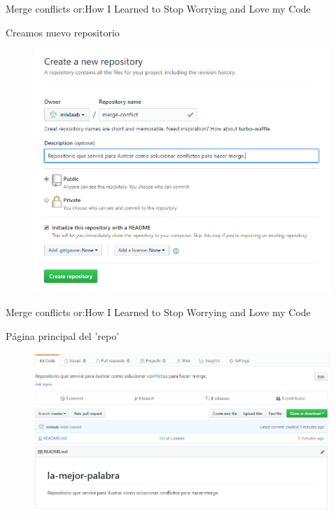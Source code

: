 \documentclass[10pt]{beamer}
\begin{document}
\begin{frame}{Merge conflicts or:}{How I Learned to Stop Worrying and Love my Code \heartsuit}

\begin{block}{Creamos nuevo repositorio}

\begin{figure}[h!]
\centering
\includegraphics [scale=0.4]{newrepo}
\label{fig:issues}
\end{figure}
    
\end{block}

\end{frame}

\begin{frame}{Merge conflicts or:}{How I Learned to Stop Worrying and Love my Code \heartsuit}

\begin{block}{Página principal del 'repo'}

\begin{figure}[h!]
\centering
\includegraphics [scale=0.35]{pagprinc}
\label{fig:issues}
\end{figure}
    
\end{block}

\end{frame}
\end{document}
